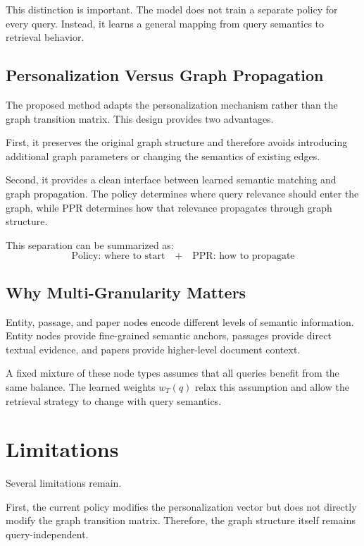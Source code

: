 \documentclass[conference]{IEEEtran}
\newcommand{\q}{q}
\begin{document}
This distinction is important. The model does not train a separate
policy for every query. Instead, it learns a general mapping from
query semantics to retrieval behavior.

\subsection{Personalization Versus Graph Propagation}

The proposed method adapts the personalization mechanism rather than
the graph transition matrix. This design provides two advantages.

First, it preserves the original graph structure and therefore avoids
introducing additional graph parameters or changing the semantics of
existing edges.

Second, it provides a clean interface between learned semantic
matching and graph propagation. The policy determines where query
relevance should enter the graph, while PPR determines how that
relevance propagates through graph structure.

This separation can be summarized as:
\begin{equation}
\boxed{
\text{Policy: where to start}
\quad+\quad
\text{PPR: how to propagate}
}
\end{equation}

\subsection{Why Multi-Granularity Matters}

Entity, passage, and paper nodes encode different levels of semantic
information. Entity nodes provide fine-grained semantic anchors,
passages provide direct textual evidence, and papers provide
higher-level document context.

A fixed mixture of these node types assumes that all queries benefit
from the same balance. The learned weights $w_T(\q)$ relax this
assumption and allow the retrieval strategy to change with query
semantics.


\section{Limitations}

Several limitations remain.

First, the current policy modifies the personalization vector but does
not directly modify the graph transition matrix. Therefore, the graph
structure itself remains query-independent.
\end{document}
